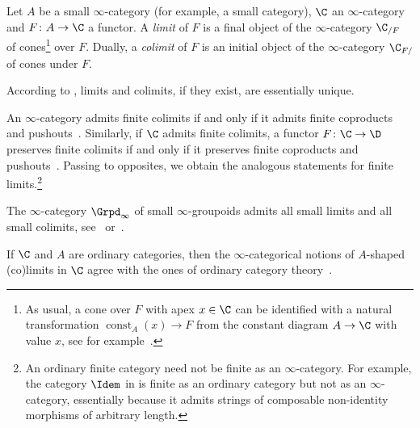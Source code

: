 \documentclass[a4paper]{amsart}
\begin{document}
\begin{definition}
  Let $A$ be a small $\infty$-category (for example, a small category), $\C$ an
  $\infty$-category and $F\colon A\to \C$ a functor. A \emph{limit} of $F$ is a
  final object of the $\infty$-category $\C_{/F}$ of cones\footnote{As usual, a
    cone over $F$ with apex $x\in\C$ can be identified with a natural
    transformation $\operatorname{const}_A(x)\to F$ from the constant diagram
    $A\to \C$ with value $x$, see for example~\cite[Section~6.2.1]{Cis19}.} over
  $F$. Dually, a \emph{colimit} of $F$ is an initial object of the
  $\infty$-category $\C_{F/}$ of cones under $F$.
\end{definition}

\begin{remark}
  According to , limits and colimits, if they
  exist, are essentially unique.
\end{remark}

\begin{remark}
  An $\infty$-category admits finite colimits if and only if it admits finite
  coproducts and pushouts~\cite[Corollary~4.4.2.4]{Lur09}. Similarly, if $\C$
  admits finite colimits, a functor $F\colon\C\to\D$ preserves finite colimits
  if and only if it preserves finite coproducts and
  pushouts~\cite[Corollary~4.4.2.5]{Lur09}. Passing to opposites, we obtain the
  analogous statements for finite limits.\footnote{An ordinary finite category
    need not be finite as an $\infty$-category. For example, the category
    $\Idem$ in  is finite as an ordinary category but not as an
    $\infty$-category, essentially because it admits strings of composable
    non-identity morphisms of arbitrary length.}
\end{remark}

\begin{remark}
  The $\infty$-category $\Grpd_\infty$ of small $\infty$-groupoids admits all
  small limits and all small colimits, see~\cite[Section~5.1.2]{Lur09}
  or~\cite[Proposition~6.2.12 and Corollary~6.3.8.]{Cis19}.
\end{remark}

\begin{remark}
  If $\C$ and $A$ are ordinary categories, then the $\infty$-categorical notions of
  $A$-shaped (co)limits in $\C$ agree with the ones of ordinary category
  theory~\cite[Section~1.2.13]{Lur09}.
\end{remark}
\end{document}
